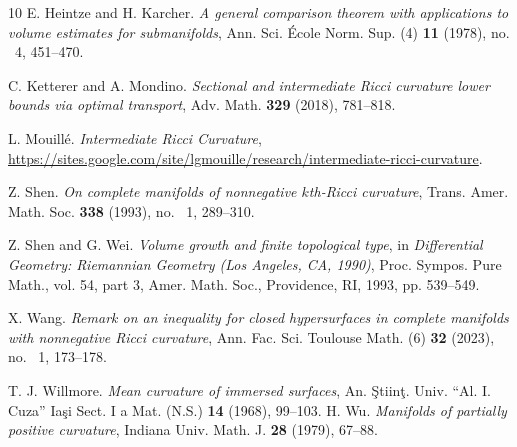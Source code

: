 \documentclass[11pt, reqno]{amsart}
\numberwithin{equation}{section}
\begin{document}
\begin{thebibliography}{10}
E. Heintze and H. Karcher.
\emph{A general comparison theorem with applications to volume estimates for submanifolds},
Ann. Sci. École Norm. Sup. (4) \textbf{11} (1978), no. ~4, 451--470.

C. Ketterer and A. Mondino.
\emph{Sectional and intermediate Ricci curvature lower bounds via optimal transport},
Adv. Math. \textbf{329} (2018), 781--818.

L. Mouill\'e.
\emph{Intermediate Ricci Curvature},
\url{https://sites.google.com/site/lgmouille/research/intermediate-ricci-curvature}.

Z. Shen.
\emph{On complete manifolds of nonnegative $k$th-Ricci curvature},
Trans. Amer. Math. Soc. \textbf{338} (1993), no. ~1, 289--310.

Z. Shen and G. Wei.
\emph{Volume growth and finite topological type},
in \emph{Differential Geometry: Riemannian Geometry (Los Angeles, CA, 1990)},
Proc. Sympos. Pure Math., vol. 54, part 3, Amer. Math. Soc., Providence, RI, 1993, pp. 539--549.

X. Wang.
\emph{Remark on an inequality for closed hypersurfaces in complete manifolds with nonnegative Ricci curvature},
Ann. Fac. Sci. Toulouse Math. (6) \textbf{32} (2023), no. ~1, 173--178.

T. J. Willmore.
\emph{Mean curvature of immersed surfaces},
An. Ştiinţ. Univ. ``Al. I. Cuza'' Iaşi Sect. I a Mat. (N.S.) \textbf{14} (1968), 99--103.
H. Wu.
\emph{Manifolds of partially positive curvature},
Indiana Univ. Math. J. \textbf{28} (1979), 67--88.

\end{thebibliography}
\end{document}
